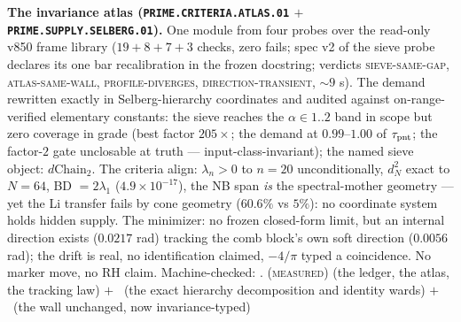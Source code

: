 \par\smallskip\noindent\textbf{The invariance atlas
(\texttt{PRIME.CRITERIA.ATLAS.01} $+$
\texttt{PRIME.SUPPLY.SELBERG.01}).}
One module from four probes over the read-only v850 frame
library ($19 + 8 + 7 + 3$ checks, zero fails; spec v2 of the
sieve probe declares its one bar recalibration in the frozen
docstring; verdicts \textsc{sieve-same-gap},
\textsc{atlas-same-wall}, \textsc{profile-diverges},
\textsc{direction-transient}, ${\sim}9$ s).  The demand
rewritten exactly in Selberg-hierarchy coordinates and audited
against on-range-verified elementary constants: the sieve
reaches the $\alpha \in 1..2$ band in scope but zero coverage in
grade (best factor $205\times$; the demand at $0.99$--$1.00$ of
$\tau_{\rm pnt}$; the factor-$2$ gate unclosable at truth ---
input-class-invariant); the named sieve object:
$d\mathrm{Chain}_2$.  The criteria align: $\lambda_n > 0$ to
$n = 20$ unconditionally, $d_N^2$ exact to $N = 64$, BD $=
2\lambda_1$ ($4.9\times10^{-17}$), the NB span \emph{is} the
spectral-mother geometry --- yet the Li transfer fails by cone
geometry ($60.6\%$ vs $5\%$): no coordinate system holds hidden
supply.  The minimizer: no frozen closed-form limit, but an
internal direction exists ($0.0217$ rad) tracking the comb
block's own soft direction ($0.0056$ rad); the drift is real, no
identification claimed, $-4/\pi$ typed a coincidence.  No marker
move, no RH claim.
Machine-checked: .
(\textsc{measured}) (the ledger, the atlas, the tracking law)
$+$ \mE\ (the exact hierarchy decomposition and identity wards)
$+$ \mO\ (the wall unchanged, now invariance-typed)
\par\smallskip


